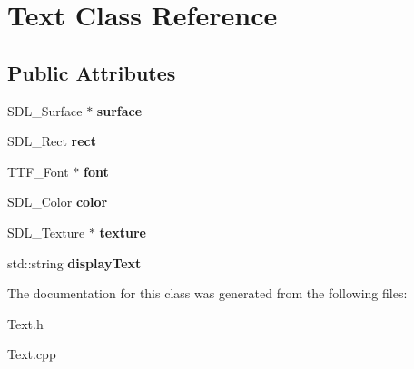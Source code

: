 \hypertarget{class_text}{}\section{Text Class Reference}
\label{class_text}
\subsection*{Public Attributes}
\begin{DoxyCompactItemize}
\item 
\hypertarget{class_text_a881e261364e0678ddcf6865bf9d668b9}{}S\+D\+L\+\_\+\+Surface $\ast$ {\bfseries surface}\label{class_text_a881e261364e0678ddcf6865bf9d668b9}

\item 
\hypertarget{class_text_abfd7707d427d99386fa552cd4a114487}{}S\+D\+L\+\_\+\+Rect {\bfseries rect}\label{class_text_abfd7707d427d99386fa552cd4a114487}

\item 
\hypertarget{class_text_ae23ac53acb57e760b91c81d8c4aec8c7}{}T\+T\+F\+\_\+\+Font $\ast$ {\bfseries font}\label{class_text_ae23ac53acb57e760b91c81d8c4aec8c7}

\item 
\hypertarget{class_text_ab0f771bd18d8e968f7aaee4a4e26e385}{}S\+D\+L\+\_\+\+Color {\bfseries color}\label{class_text_ab0f771bd18d8e968f7aaee4a4e26e385}

\item 
\hypertarget{class_text_aea2a82ef1d8b4d448b6b3e524bce2cc2}{}S\+D\+L\+\_\+\+Texture $\ast$ {\bfseries texture}\label{class_text_aea2a82ef1d8b4d448b6b3e524bce2cc2}

\item 
\hypertarget{class_text_a1628dc5c1a3c44d1aefa9a329b99ce7d}{}std\+::string {\bfseries display\+Text}\label{class_text_a1628dc5c1a3c44d1aefa9a329b99ce7d}

\end{DoxyCompactItemize}


The documentation for this class was generated from the following files\+:\begin{DoxyCompactItemize}
\item 
Text.\+h\item 
Text.\+cpp\end{DoxyCompactItemize}
